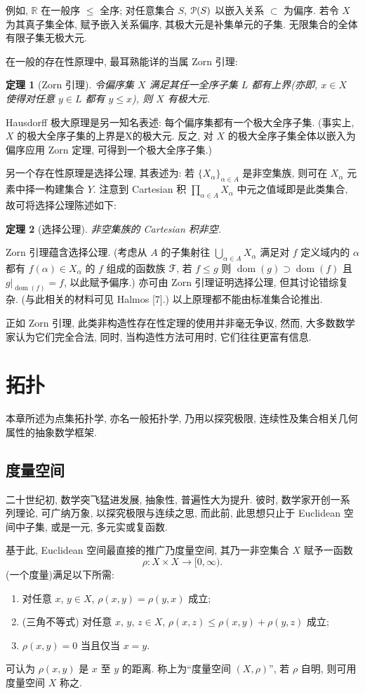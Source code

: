 \documentclass[twoside, fontset=fandol, punct=kaiming]{ctexbook}
\DeclareMathOperator{\dom}{dom}
\let \mathcal \EuScript
\theoremstyle{innocent}
\newtheorem*{theorem}{定理}
\begin{document}
例如, $\mathbb R$ 在一般序 $\leqslant $ 全序; 对任意集合 $S$, $\mathcal P(S)$ 以嵌入关系 $\subset$ 为偏序. 若令 $X$ 为其真子集全体, 赋予嵌入关系偏序, 其极大元是补集单元的子集. 无限集合的全体有限子集无极大元.

在一般的存在性原理中, 最耳熟能详的当属 Zorn 引理:
\begin{theorem}[Zorn 引理]
    令偏序集 $X$ 满足其任一全序子集 $L$ 都有上界(亦即, $x\in X$ 使得对任意 $y\in L$ 都有 $y\leqslant x$), 则 $X$ 有极大元.
\end{theorem}
Hausdorff 极大原理是另一知名表述: 每个偏序集都有一个极大全序子集. (事实上, $X$ 的极大全序子集的上界是X的极大元. 反之, 对 $X$ 的极大全序子集全体以嵌入为偏序应用 Zorn 定理, 可得到一个极大全序子集.)

另一个存在性原理是选择公理, 其表述为: 若 $\{X_\alpha\}_{\alpha\in A}$ 是非空集族, 则可在 $X_\alpha$ 元素中择一构建集合 $Y$. 注意到 Cartesian 积 $\prod_{\alpha\in A}X_\alpha$ 中元之值域即是此类集合, 故可将选择公理陈述如下:
\begin{theorem}[选择公理]
    非空集族的 Cartesian 积非空.
\end{theorem}
Zorn 引理蕴含选择公理. (考虑从 $A$ 的子集射往 $\bigcup_{\alpha\in A}X_\alpha$ 满足对 $f$ 定义域内的 $\alpha$ 都有 $f(\alpha)\in X_\alpha$ 的 $f$ 组成的函数族 $\mathcal F$, 若 $f\leqslant g$ 则 $\dom(g)\supset\dom(f)$ 且 $g|_{\dom(f)}=f$, 以此赋予偏序.) 亦可由 Zorn 引理证明选择公理, 但其讨论错综复杂. (与此相关的材料可见 Halmos [7].) 以上原理都不能由标准集合论推出.

正如 Zorn 引理, 此类非构造性存在性定理的使用并非毫无争议, 然而, 大多数数学家认为它们完全合法, 同时, 当构造性方法可用时, 它们往往更富有信息.

\chapter{拓扑}
本章所述为点集拓扑学, 亦名一般拓扑学, 乃用以探究极限, 连续性及集合相关几何属性的抽象数学框架.

\section{度量空间}
二十世纪初, 数学突飞猛进发展, 抽象性, 普遍性大为提升. 彼时, 数学家开创一系列理论, 可广纳万象, 以探究极限与连续之思, 而此前, 此思想只止于 Euclidean 空间中子集, 或是一元, 多元实或复函数.

基于此, Euclidean 空间最直接的推广乃度量空间, 其乃一非空集合 $X$ 赋予一函数
\[\rho :X\times X\to [0,\infty).\]
(一个度量)满足以下所需:
\begin{enumerate}
    \item 对任意 $x$, $y\in X$, $\rho (x,y)=\rho (y,x)$ 成立;
    \item (三角不等式) 对任意 $x$, $y$, $z\in X$, $\rho (x,z)\leqslant \rho (x,y)+\rho (y,z)$ 成立;
    \item $\rho (x,y)=0$ 当且仅当 $x=y$.
\end{enumerate}
可认为 $\rho (x,y)$ 是 $x$ 至 $y$ 的距离. 称上为``度量空间 $(X,\rho)$'', 若 $\rho $ 自明, 则可用度量空间 $X$ 称之.
\end{document}
